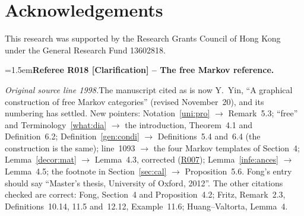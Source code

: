 \documentclass[12pt]{amsart}
\newcommand{\RefereeRemark}[4]{%
  \par\medskip\begingroup\normalfont\small\color{RefereePurple}%
  \emergencystretch=1.5em\noindent\textbf{Referee R#1 [#2] -- #3.}\par\nobreak\noindent #4\par
  \endgroup\medskip
}
\theoremstyle{plain}
\theoremstyle{definition}
\theoremstyle{remark}
\numberwithin{equation}{section}
\theoremstyle{plain}
\newcommand{\0}{\emptyset}
\begin{document}
\section*{Acknowledgements}
This research was supported by the Research Grants Council of Hong Kong
under the General Research Fund 13602818.
\hypertarget{review-018}{}\RefereeRemark{018}{Clarification}{The free Markov reference}{%
\textit{Original source line 1998.}\quad The manuscript cited as \cite{YinZhangModularity} is now Y.~Yin, ``A graphical construction of free Markov categories'' (revised November~20), and its numbering has settled. New pointers: Notation~\ref{uni:pro} $\to$ Remark~5.3; ``free'' and Terminology~\ref{what:dia} $\to$ the introduction, Theorem~4.1 and Definition~6.2; Definition~\ref{gen:condi} $\to$ Definitions~5.4 and~6.4 (the construction is the same); line~1093 $\to$ the four Markov templates of Section~4; Lemma~\ref{decor:mat} $\to$ Lemma~4.3, corrected (\hyperlink{review-007}{R007}); Lemma~\ref{infe:ances} $\to$ Lemma~4.5; the footnote in Section~\ref{sec:cal} $\to$ Proposition~5.6. Fong's entry should say ``Master's thesis, University of Oxford, 2012''. The other citations checked are correct: Fong, Section~4 and Proposition~4.2; Fritz, Remark~2.3, Definitions~10.14, 11.5 and~12.12, Example~11.6; Huang--Valtorta, Lemma~4.
}
\end{document}
